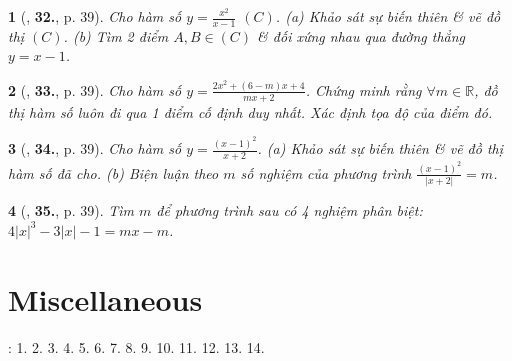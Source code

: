 \documentclass{article}
\newtheorem{baitoan}{}
\begin{document}
\begin{baitoan}[\cite{TLCT_giai_tich_12}, \textbf{32.}, p. 39]
	Cho hàm số $y = \frac{x^2}{x - 1}$ $(C)$. (a) Khảo sát sự biến thiên \& vẽ đồ thị $(C)$. (b) Tìm 2 điểm $A,B\in(C)$ \& đối xứng nhau qua đường thẳng $y = x - 1$.	
\end{baitoan}

\begin{baitoan}[\cite{TLCT_giai_tich_12}, \textbf{33.}, p. 39]
	Cho hàm số $y = \frac{2x^2 + (6 - m)x + 4}{mx + 2}$. Chứng minh rằng $\forall m\in\mathbb{R}$, đồ thị hàm số luôn đi qua 1 điểm cố định duy nhất. Xác định tọa độ của điểm đó.
\end{baitoan}

\begin{baitoan}[\cite{TLCT_giai_tich_12}, \textbf{34.}, p. 39]
	Cho hàm số $y = \frac{(x - 1)^2}{x + 2}$. (a) Khảo sát sự biến thiên \& vẽ đồ thị hàm số đã cho. (b) Biện luận theo $m$ số nghiệm của phương trình $\frac{(x - 1)^2}{|x + 2|} = m$.	
\end{baitoan}

\begin{baitoan}[\cite{TLCT_giai_tich_12}, \textbf{35.}, p. 39]
	Tìm $m$ để phương trình sau có 4 nghiệm phân biệt: $4|x|^3 - 3|x| - 1 = mx - m$.
\end{baitoan}


\section{Miscellaneous}
\cite[BTCCI, pp. 45--48]{SGK_Toan_12_Canh_Dieu_tap_1}: 1. 2. 3. 4. 5. 6. 7. 8. 9. 10. 11. 12. 13. 14.


\printbibliography[heading=bibintoc]
	
\end{document}
